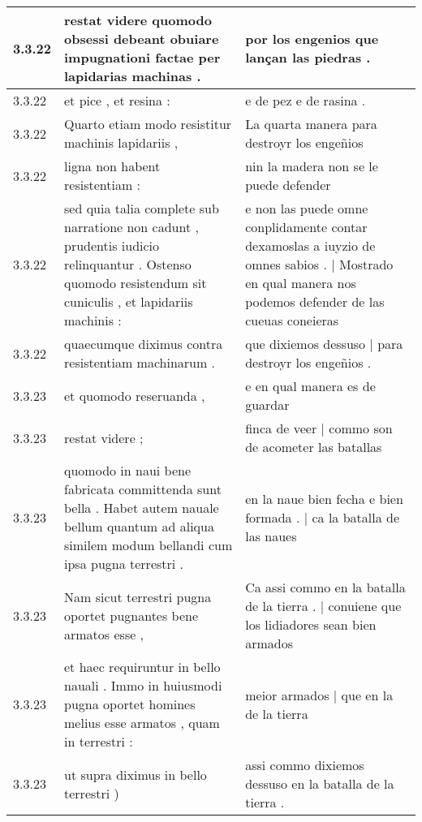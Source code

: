 \begin{tabular}{|p{1cm}|p{6.5cm}|p{6.5cm}|}
3.3.22 & restat videre quomodo obsessi debeant obuiare impugnationi factae per lapidarias machinas . & por los engenios que lançan las piedras . \\\hline
3.3.22 & et pice , et resina : & e de pez e de rasina . \\\hline
3.3.22 & Quarto etiam modo resistitur machinis lapidariis , & La quarta manera para destroyr los engeñios \\\hline
3.3.22 & ligna non habent resistentiam : & nin la madera non se le puede defender \\\hline
3.3.22 & sed quia talia complete sub narratione non cadunt , prudentis iudicio relinquantur . Ostenso quomodo resistendum sit cuniculis , et lapidariis machinis : & e non las puede omne conplidamente contar dexamoslas a iuyzio de omnes sabios . | Mostrado en qual manera nos podemos defender de las cueuas coneieras \\\hline
3.3.22 & quaecumque diximus contra resistentiam machinarum . & que dixiemos dessuso | para destroyr los engeñios . \\\hline
3.3.23 & et quomodo reseruanda , & e en qual manera es de guardar \\\hline
3.3.23 & restat videre ; & finca de veer | commo son de acometer las batallas \\\hline
3.3.23 & quomodo in naui bene fabricata committenda sunt bella . Habet autem nauale bellum quantum ad aliqua similem modum bellandi cum ipsa pugna terrestri . & en la naue bien fecha e bien formada . | ca la batalla de las naues \\\hline
3.3.23 & Nam sicut terrestri pugna oportet pugnantes bene armatos esse , & Ca assi commo en la batalla de la tierra . | conuiene que los lidiadores sean bien armados \\\hline
3.3.23 & et haec requiruntur in bello nauali . Immo in huiusmodi pugna oportet homines melius esse armatos , quam in terrestri : & meior armados | que en la de la tierra \\\hline
3.3.23 & ut supra diximus in bello terrestri ) & assi commo dixiemos dessuso en la batalla de la tierra . \\\hline

\end{tabular}
